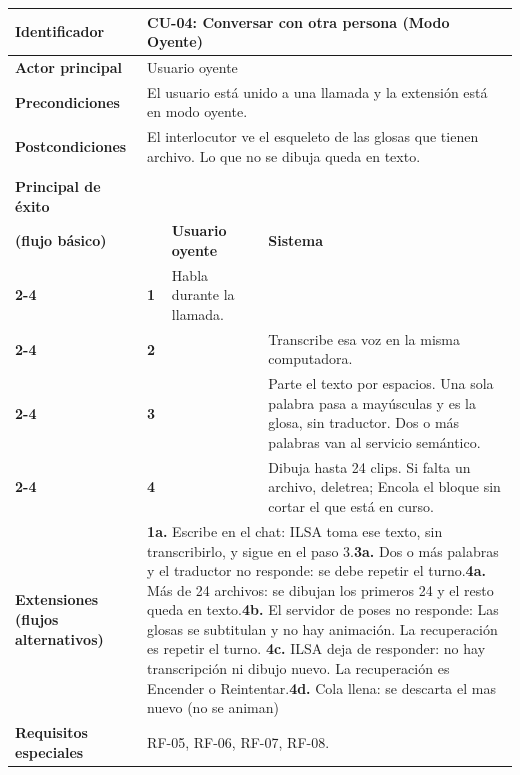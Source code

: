 \begin{table}[h!]
\centering
\renewcommand{\arraystretch}{1.35}
\begin{tabularx}{\textwidth}{|>{\raggedright\arraybackslash\bfseries}p{4cm}|p{0.5cm}|X|X|}
\hline
Identificador & \multicolumn{3}{p{\dimexpr\textwidth-4.5cm-4\tabcolsep\relax}|}{\textbf{CU-04: Conversar con otra persona (Modo Oyente)}} \\ \hline
Actor principal & \multicolumn{3}{p{\dimexpr\textwidth-4.5cm-4\tabcolsep\relax}|}{Usuario oyente} \\ \hline
Precondiciones & \multicolumn{3}{p{\dimexpr\textwidth-4.5cm-4\tabcolsep\relax}|}{El usuario está unido a una llamada y la extensión está en modo oyente.} \\ \hline
Postcondiciones & \multicolumn{3}{p{\dimexpr\textwidth-4.5cm-4\tabcolsep\relax}|}{El interlocutor ve el esqueleto de las glosas que tienen archivo. Lo que no se dibuja queda en texto.} \\ \hline
\multirow{3}{4cm}{Escenario\\ Principal de éxito\\ (flujo básico)}
 & & \textbf{Usuario oyente} & \textbf{Sistema} \\ \cline{2-4}
 & \textbf{1} & Habla durante la llamada. & \\ \cline{2-4}
 & \textbf{2} & & Transcribe esa voz en la misma computadora. \\  \cline{2-4}
 & \textbf{3} & & Parte el texto por espacios. Una sola palabra pasa a mayúsculas y es la glosa, sin traductor. Dos o más palabras van al servicio semántico. \\  \cline{2-4}
 & \textbf{4} & & Dibuja hasta 24 clips. Si falta un archivo, deletrea; Encola el bloque sin cortar el que está en curso. \\ \hline
Extensiones (flujos alternativos) & \multicolumn{3}{p{\dimexpr\textwidth-4.5cm-4\tabcolsep\relax}|}{\textbf{1a.} Escribe en el chat: ILSA toma ese texto, sin transcribirlo, y sigue en el paso 3.\newline\textbf{3a.} Dos o más palabras y el traductor no responde: se debe repetir el turno.\newline\textbf{4a.} Más de 24 archivos: se dibujan los primeros 24 y el resto queda en texto.\newline\textbf{4b.} El servidor de poses no responde: Las glosas se subtitulan y no hay animación. La recuperación es repetir el turno. \newline\textbf{4c.} ILSA deja de responder: no hay transcripción ni dibujo nuevo. La recuperación es Encender o Reintentar.\newline\textbf{4d.} Cola llena: se descarta el mas nuevo (no se animan)} \\ \hline %
Requisitos especiales & \multicolumn{3}{p{\dimexpr\textwidth-4.5cm-4\tabcolsep\relax}|}{RF-05, RF-06, RF-07, RF-08.} \\ \hline
\end{tabularx}
\end{table}

